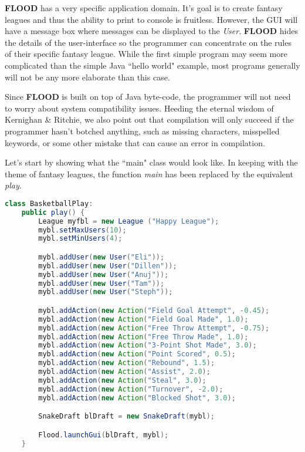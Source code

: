 \documentclass[12pt]{report}
\begin{document}
\begin{doublespace}
\textbf{FLOOD} has a very specific application domain. It's goal is to create fantasy leagues and thus the ability to print to console is fruitless. However, the GUI will have a message box where messages can be displayed to the \textit{User}. \textbf{FLOOD} hides the details of the user-interface so the programmer can concentrate on the rules of their specific fantasy league. While the first simple program may seem more complicated than the simple Java ``hello world" example, most programs generally will not be any more elaborate than this case.

Since \textbf{FLOOD} is built on top of Java byte-code, the programmer will not need to worry about system compatibility issues. Heeding the eternal wisdom of Kernighan \& Ritchie, we also point out that compilation will only succeed if the programmer hasn't botched anything, such as missing characters, misspelled keywords, or some other mistake that can cause an error in compilation. 

Let's start by showing what the ``main" class would look like. In keeping with the theme of fantasy leagues, the function \textit{main} has been replaced by the equivalent \textit{play}. 
\end{doublespace}

\begin{lstlisting}[language=Java,label=some-code,caption=BasketballPlay.fld]
class BasketballPlay:
	public play() {
		League myfbl = new League ("Happy League");
		mybl.setMaxUsers(10);
		mybl.setMinUsers(4);

		mybl.addUser(new User("Eli"));
		mybl.addUser(new User("Dillen"));
		mybl.addUser(new User("Anuj"));
		mybl.addUser(new User("Tam"));
		mybl.addUser(new User("Steph"));

		mybl.addAction(new Action("Field Goal Attempt", -0.45);
		mybl.addAction(new Action("Field Goal Made", 1.0);
		mybl.addAction(new Action("Free Throw Attempt", -0.75);
		mybl.addAction(new Action("Free Throw Made", 1.0);
		mybl.addAction(new Action("3-Point Shot Made", 3.0);
		mybl.addAction(new Action("Point Scored", 0.5);
		mybl.addAction(new Action("Rebound", 1.5);
		mybl.addAction(new Action("Assist", 2.0);
		mybl.addAction(new Action("Steal", 3.0);
		mybl.addAction(new Action("Turnover", -2.0);
		mybl.addAction(new Action("Blocked Shot", 3.0);

		SnakeDraft blDraft = new SnakeDraft(mybl);

		Flood.launchGui(blDraft, mybl);
	}
\end{lstlisting}
\end{document}
